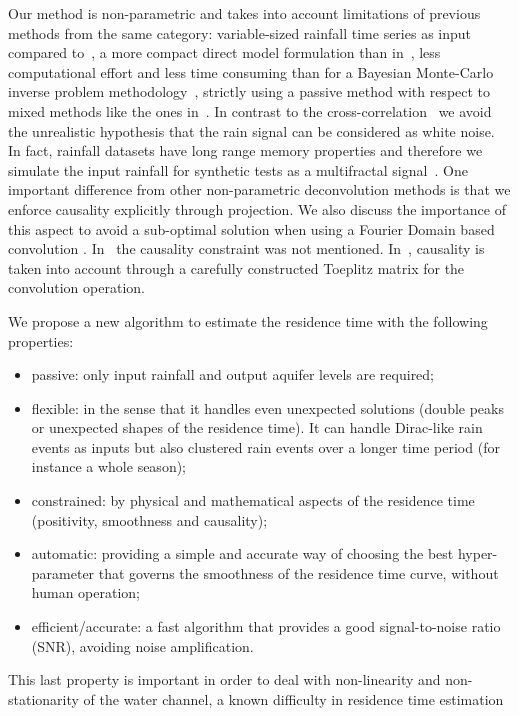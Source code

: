 \documentclass[]{elsarticle} %
\begin{document}
Our method is non-parametric and takes into account limitations of previous methods from the same category: variable-sized rainfall time series as input compared to~\cite{Z_Hydro_Neuman1982}, a more compact direct model formulation than in~\cite{Z_Hydro_Neuman1982, Z_Hydro_Cirpka2007}, less computational effort and less time consuming than for a Bayesian Monte-Carlo inverse problem methodology~\cite{Fienen2006, Fienen2008},  strictly using a passive method with respect to mixed methods like the ones in~\cite{Z_Hydro_Gooseff2011}. In contrast to the cross-correlation~\cite{ Vogt2010, Z_Hydro_Delbart_2014} we avoid the unrealistic hypothesis that the rain signal can be considered as white noise. In fact, rainfall datasets have long range memory properties and therefore we simulate the input rainfall for synthetic tests as a multifractal signal~\cite{Z_Hydro_Tessier1996b}. One important difference from other non-parametric deconvolution methods is that we enforce causality explicitly through projection. We also discuss the importance of this aspect to avoid a sub-optimal solution when using a Fourier Domain based convolution \cite{McCormick1969}. In~\cite{Z_Hydro_Neuman1982, Dietrich1993, Z_Hydro_Delbart_2014} the causality constraint was not mentioned. In~\cite{ Skaggs1998, Z_Hydro_Cirpka2007, Z_Hydro_PaynGooseff2008, Z_Hydro_Gooseff2011}, causality is taken into account through a carefully constructed Toeplitz matrix for the convolution operation.

We propose a new algorithm to estimate the residence time with the following properties:
\begin{itemize}
    \item passive: only input rainfall and output aquifer levels are required;
    \item flexible: in the sense that it handles even unexpected solutions (double peaks or unexpected shapes of the residence time). It can handle Dirac-like rain events as inputs but also clustered rain events over a longer time period (for instance a whole season);
    \item constrained: by physical and mathematical aspects of the residence time (positivity, smoothness and causality);
    \item automatic: providing a simple and accurate way of choosing the best hyper-parameter that governs the smoothness of the residence time curve, without human operation;
    \item efficient/accurate: a fast algorithm that provides a good signal-to-noise ratio (SNR), avoiding noise amplification.
\end{itemize}
This last property is important in order to deal with  non-linearity and non-stationarity of the water channel, a known difficulty in residence time estimation~\cite{Z_Hydro_NeumanDeMarsily1976, Z_Hydro_Massei2006, Z_Hydro_McGuireMcDonnell2006, Z_Hydro_PaynGooseff2008} 
\end{document}
